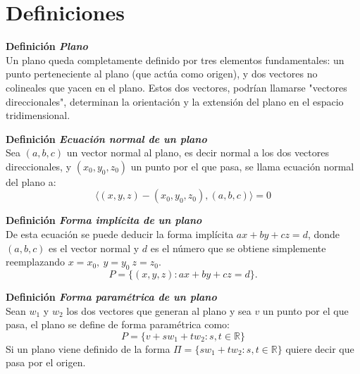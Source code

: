 \documentclass{article}
\newenvironment{definition}[2][Definición]
    { \begin{mdframed}[backgroundcolor=red!20] \textbf{#1 #2} \\}
    {  \end{mdframed}}
\begin{document}
\section*{Definiciones}
\begin{definition}{\textit{Plano}}
    Un plano queda completamente definido por tres elementos fundamentales: un punto perteneciente al plano (que actúa como origen), y dos vectores no colineales que yacen en el plano. Estos dos vectores, podrían llamarse "vectores direccionales", determinan la orientación y la extensión del plano en el espacio tridimensional.
\end{definition}
\begin{definition}{\textit{Ecuación normal de un plano}}
    Sea $(a,b,c)$ un vector normal al plano, es decir normal a los dos vectores direccionales, y $(x_0,y_0,z_0)$ un punto por el que pasa, se llama ecuación normal del plano a:
\[
\langle (x,y,z) - (x_0,y_0,z_0) , (a,b,c) \rangle=0
\]
\end{definition}
\begin{definition}{\textit{Forma implícita de un plano}}
    De esta ecuación se puede deducir la forma implícita $ax+by+cz=d$, donde $(a,b,c)$ es el vector normal y $d$ es el número que se obtiene simplemente reemplazando $x=x_0, \ y=y_0 \ z=z_0$.
\[
P = \{ (x,y,z) : ax+by+cz = d\}.
\]
\end{definition}
\begin{definition}{\textit{Forma paramétrica de un plano}}
    Sean $w_1$ y $w_2$ los dos vectores que generan al plano y sea $v$ un punto por el que pasa, el plano se define de forma paramétrica como:
    \[
    P = \{ v + sw_1+tw_2: s,t \in \mathbb{R} \}
    \]
    Si un plano viene definido de la forma $\Pi = \{ sw_1+tw_2: s,t \in \mathbb{R} \}$ quiere decir que pasa por el origen.    
\end{definition}

\end{document}

